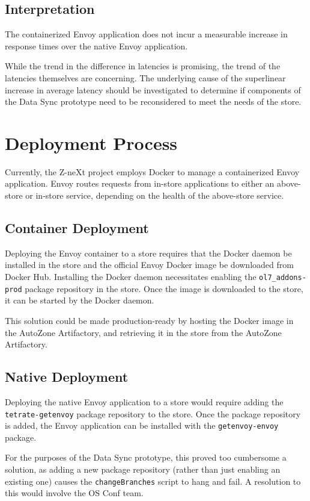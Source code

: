 \documentclass{article}
\begin{document}
\subsection{Interpretation}
The containerized Envoy application does not incur a measurable increase in response times over the native Envoy application.

While the trend in the difference in latencies is promising, the trend of the latencies themselves are concerning. The underlying cause of the superlinear increase in average latency should be investigated to determine if components of the Data Sync prototype need to be reconsidered to meet the needs of the store.

\section{Deployment Process}
Currently, the Z-neXt project employs Docker to manage a containerized Envoy application. Envoy routes requests from in-store applications to either an above-store or in-store service, depending on the health of the above-store service.

\subsection{Container Deployment}
Deploying the Envoy container to a store requires that the Docker daemon be installed in the store and the official Envoy Docker image be downloaded from Docker Hub. Installing the Docker daemon necessitates enabling the \texttt{ol7\_addons-prod} package repository in the store. Once the image is downloaded to the store, it can be started by the Docker daemon.

This solution could be made production-ready by hosting the Docker image in the AutoZone Artifactory, and retrieving it in the store from the AutoZone Artifactory.

\subsection{Native Deployment}
Deploying the native Envoy application to a store would require adding the \texttt{tetrate-getenvoy} package repository to the store. Once the package repository is added, the Envoy application can be installed with the \texttt{getenvoy-envoy} package.

For the purposes of the Data Sync prototype, this proved too cumbersome a solution, as adding a new package repository (rather than just enabling an existing one) causes the \texttt{changeBranches} script to hang and fail. A resolution to this would involve the OS Conf team.
\end{document}
